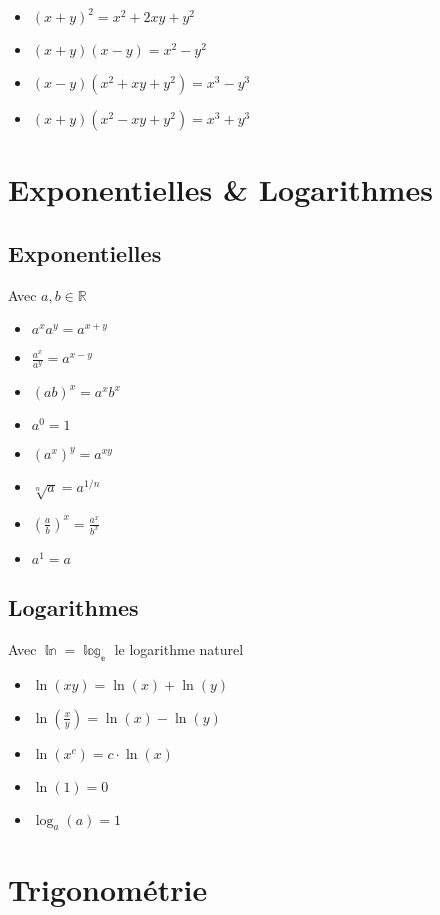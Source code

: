 \documentclass[10pt,a4paper]{book}
\newcommand{\R}{\mathbb{R}}
\begin{document}
\begin{itemize}
\item $(x+y)^2 = x^2 + 2xy + y^2$
\item $(x+y)(x-y) = x^2-y^2$
\item $(x-y)(x^2+xy+y^2) = x^3-y^3$
\item $(x+y)(x^2-xy+y^2) = x^3+y^3$
\end{itemize}

\section{Exponentielles \& Logarithmes}

\subsection{Exponentielles}

Avec $a,b \in \R$
\begin{itemize}
\item $a^xa^y = a^{x+y}$
\item $\frac{a^x}{a^y} = a^{x-y}$
\item $(ab)^x = a^xb^x$
\item $a^0 = 1$
\item $(a^x)^y = a^{xy}$
\item $\sqrt[n]{a} = a^{1/n}$
\item $\left(\frac{a}{b}\right)^x = \frac{a^x}{b^x}$
\item $a^1 = a$
\end{itemize}

\subsection{Logarithmes}

Avec $\mathbb{\ln = \log_e}$ le logarithme naturel
\begin{itemize}
\item $\ln(xy) = \ln(x) + \ln(y)$
\item $\ln(\frac{x}{y}) = \ln(x) - \ln(y)$
\item $\ln(x^c) = c\cdot \ln(x)$
\item $\ln(1) = 0$
\item $\log_a(a) = 1$
\end{itemize}

\section{Trigonométrie}
\end{document}
